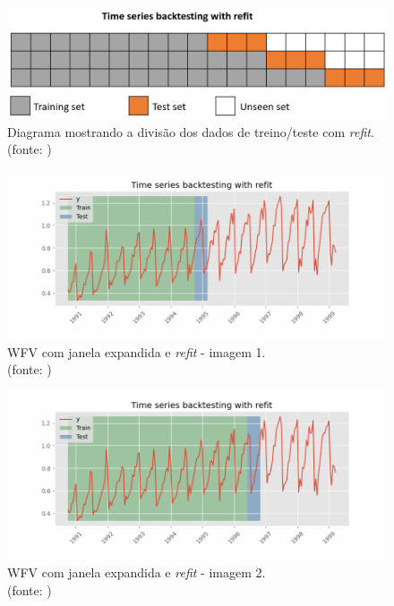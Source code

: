 \begin{figure}[!h]
	\centering
	\includegraphics[scale=0.3]{Figuras/skforecast-diagram-backtesting-refit.png}
	\caption{Diagrama mostrando a divisão dos dados de treino/teste com \textit{refit}.\\(fonte: \cite{skforecast})}
	\label{fig:skforecast-diagram-backtesting-refit}
\end{figure}

\begin{figure}[!h]
	\centering
	\includegraphics[scale=0.3]{Figuras/imagem1_skforecast-backtesting-refit.png}
	\caption{WFV com janela expandida e \textit{refit} - imagem 1.\\(fonte: \cite{skforecast})}
	\label{fig:imagem1_skforecast-backtesting-refit}
\end{figure}

\begin{figure}[!h]
	\centering
	\includegraphics[scale=0.3]{Figuras/imagem2_skforecast-backtesting-refit.png}
	\caption{WFV com janela expandida e \textit{refit} - imagem 2.\\(fonte: \cite{skforecast})}
	\label{fig:imagem2_skforecast-backtesting-refit}
\end{figure}

